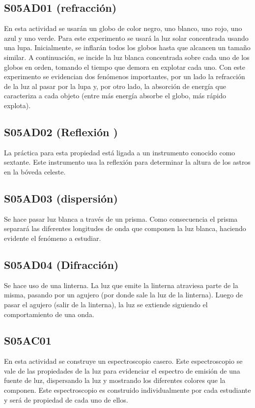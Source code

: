 \documentclass[10pt,a4paper]{article}
\begin{document}
\subsection{S05AD01 (refracción)}
En esta actividad se usarán un globo de color negro, uno blanco, uno rojo, uno azul y uno verde. Para este experimento se usará la luz solar concentrada usando una lupa. Inicialmente, se inflarán todos los globos hasta que alcancen un tamaño similar. A continuación, se incide la luz blanca concentrada sobre cada uno de los globos en orden, tomando el tiempo que demora en explotar cada uno. Con este experimento se evidencian dos fenómenos importantes, por un lado la refracción de la luz al pasar por la lupa y, por otro lado, la absorción de energía que caracteriza a cada objeto (entre más energía absorbe el globo, más rápido explota).

\subsection{S05AD02 (Reflexión )}
La práctica para esta propiedad está ligada a un instrumento conocido como sextante. Este instrumento usa la reflexión para determinar la altura de los astros en la bóveda celeste.
\subsection{S05AD03 (dispersión)}
Se hace pasar luz blanca a través de un prisma. Como consecuencia el prisma separará las diferentes longitudes de onda que componen la luz blanca, haciendo evidente el fenómeno a estudiar. 
\subsection{S05AD04 (Difracción)}
Se hace uso de una linterna. La luz que emite la linterna atraviesa parte de la misma, pasando por un agujero (por donde sale la luz de la linterna). Luego de pasar el agujero (salir de la linterna), la luz se extiende siguiendo el comportamiento de una onda.

\subsection{S05AC01}
En esta actividad se construye un espectroscopio casero. Este espectroscopio se vale de las propiedades de la luz para evidenciar el espectro de emisión de una fuente de luz, dispersando la luz y mostrando los diferentes colores que la componen. Este espectroscopio es construido individualmente por cada estudiante y será de propiedad de cada uno de ellos.
\end{document}
